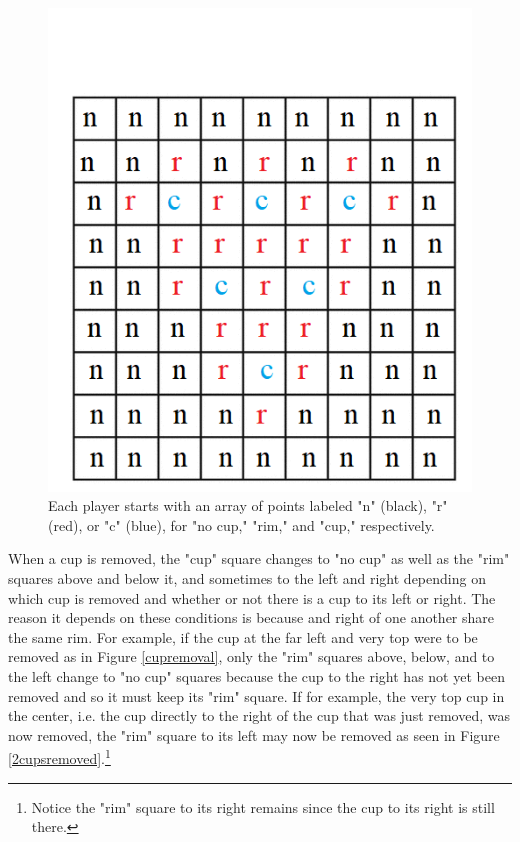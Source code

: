 \documentclass{article}
\begin{document}
\begin{figure}
	\centering
	\includegraphics[width=0.7\linewidth]{gridwletters}
	\caption{Each player starts with an array of points labeled "n" (black), "r" (red), or "c" (blue), for "no cup," "rim," and "cup," respectively.}
	\label{points}
\end{figure}

When a cup is removed, the "cup" square changes to "no cup" as well as the "rim" squares above and below it, and sometimes to the left and right depending on which cup is removed and whether or not there is a cup to its left or right. The reason it depends on these conditions is because and right of one another share the same rim. For example, if the cup at the far left and very top were to be removed as in Figure \ref{cupremoval}, only the "rim" squares above, below, and to the left change to "no cup" squares because the cup to the right has not yet been removed and so it must keep its "rim" square. If for example, the very top cup in the center, i.e. the cup directly to the right of the cup that was just removed, was now removed, the "rim" square to its left may now be removed as seen in Figure \ref{2cupsremoved}.\footnote{Notice the "rim" square to its right remains since the cup to its right is still there.}
\end{document}
